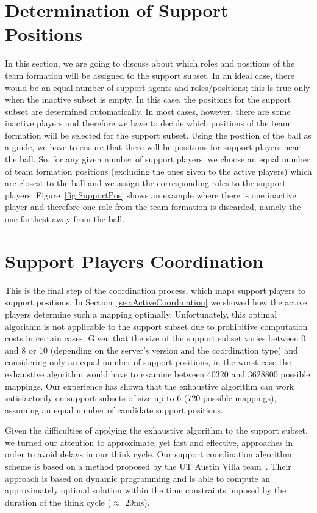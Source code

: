 \section{Determination of Support Positions}
In this section, we are going to discuss about which roles and positions of the team formation will be assigned to the support subset. In an ideal case, there would be an equal number of support agents and roles/positions; this is true only when the inactive subset is empty. In this case, the positions for the support subset are determined automatically. In most cases, however, there are some inactive players and therefore we have to decide which positions of the team formation will be selected for the support subset. Using the position of the ball as a guide, we have to ensure that there will be positions for support players near the ball. So, for any given number of support players, we choose an equal number of team formation positions (excluding the ones given to the active players) which are closest to the ball and we assign the corresponding roles to the support players. Figure~\ref{fig:SupportPos} shows an example where there is one inactive player and therefore one role from the team formation is discarded, namely the one farthest away from the ball. 





\section{Support Players Coordination}
This is the final step of the coordination process, which maps support players to support positions. In Section~\ref{sec:ActiveCoordination} we showed how the active players determine such a mapping optimally. Unfortunately, this optimal algorithm is not applicable to the support subset due to prohibitive computation costs in certain cases. Given that the size of the support subset varies between 0 and 8 or 10 (depending on the server's version and the coordination type) and considering only an equal number of support positions, in the worst case the exhaustive algorithm would have to examine between 40320 and 3628800 possible mappings. Our experience has shown that the exhaustive algorithm can work satisfactorily on support subsets of size up to 6 (720 possible mappings), assuming an equal number of candidate support positions.  

Given the difficulties of applying the exhaustive algorithm to the support subset, we turned our attention to approximate, yet fast and effective, approaches in order to avoid delays in our think cycle. Our support coordination algorithm scheme is based on a method proposed by the UT Austin Villa team~\cite{UtAustinVillaPaper}. Their approach is based on dynamic programming and is able to compute an approximately optimal solution within the time constraints imposed by the duration of the think cycle ($\approx$ 20ms).

